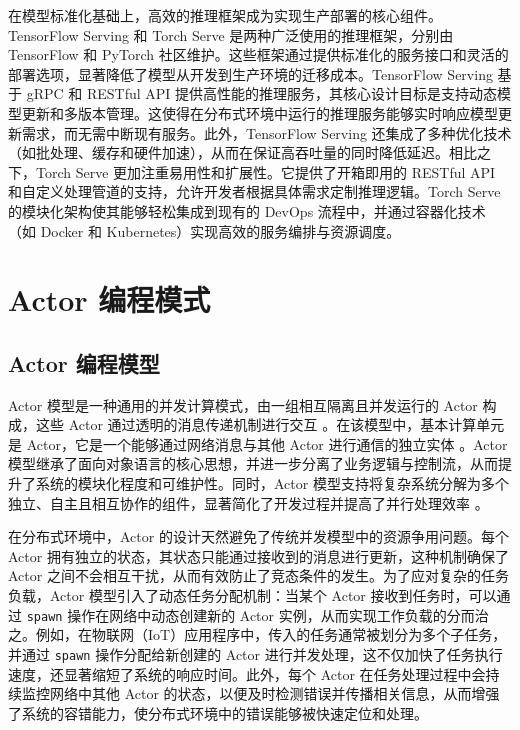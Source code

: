 在模型标准化基础上，高效的推理框架成为实现生产部署的核心组件。TensorFlow Serving\cite{olston2017tensorflow} 和 Torch Serve\cite{pytorch2020serve} 是两种广泛使用的推理框架，分别由 TensorFlow 和 PyTorch 社区维护。这些框架通过提供标准化的服务接口和灵活的部署选项，显著降低了模型从开发到生产环境的迁移成本。TensorFlow Serving 基于 gRPC 和 RESTful API 提供高性能的推理服务，其核心设计目标是支持动态模型更新和多版本管理。这使得在分布式环境中运行的推理服务能够实时响应模型更新需求，而无需中断现有服务。此外，TensorFlow Serving 还集成了多种优化技术（如批处理、缓存和硬件加速），从而在保证高吞吐量的同时降低延迟。相比之下，Torch Serve 更加注重易用性和扩展性。它提供了开箱即用的 RESTful API 和自定义处理管道的支持，允许开发者根据具体需求定制推理逻辑。Torch Serve 的模块化架构使其能够轻松集成到现有的 DevOps 流程中，并通过容器化技术（如 Docker 和 Kubernetes）实现高效的服务编排与资源调度。

\section{Actor 编程模式}

\subsection{Actor 编程模型}

Actor 模型是一种通用的并发计算模式，由一组相互隔离且并发运行的 Actor 构成，这些 Actor 通过透明的消息传递机制进行交互 \cite{agha1986actors}。在该模型中，基本计算单元是 Actor，它是一个能够通过网络消息与其他 Actor 进行通信的独立实体 \cite{hewitt2010actor}。Actor 模型继承了面向对象语言的核心思想，并进一步分离了业务逻辑与控制流，从而提升了系统的模块化程度和可维护性。同时，Actor 模型支持将复杂系统分解为多个独立、自主且相互协作的组件，显著简化了开发过程并提高了并行处理效率 \cite{srirama2021akka}。

在分布式环境中，Actor 的设计天然避免了传统并发模型中的资源争用问题。每个 Actor 拥有独立的状态，其状态只能通过接收到的消息进行更新，这种机制确保了 Actor 之间不会相互干扰，从而有效防止了竞态条件的发生。为了应对复杂的任务负载，Actor 模型引入了动态任务分配机制：当某个 Actor 接收到任务时，可以通过 \texttt{spawn} 操作在网络中动态创建新的 Actor 实例，从而实现工作负载的分而治之。例如，在物联网（IoT）应用程序中，传入的任务通常被划分为多个子任务，并通过 \texttt{spawn} 操作分配给新创建的 Actor 进行并发处理，这不仅加快了任务执行速度，还显著缩短了系统的响应时间。此外，每个 Actor 在任务处理过程中会持续监控网络中其他 Actor 的状态，以便及时检测错误并传播相关信息，从而增强了系统的容错能力，使分布式环境中的错误能够被快速定位和处理。

